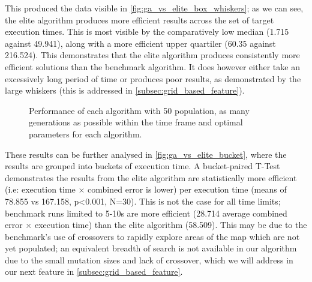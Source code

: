 \documentclass[authoryearcitations]{UoYCSproject}
\begin{document}
This produced the data visible in \autoref{fig:ga_vs_elite_box_whiskers}; as we can see, the elite algorithm produces more efficient results across the set of target execution times. This is most visible by the comparatively low median (1.715 against 49.941), along with a more efficient upper quartiler (60.35 against 216.524). This demonstrates that the elite algorithm produces consistently more efficient solutions than the benchmark algorithm. It does however either take an excessively long period of time or produces poor results, as demonstrated by the large whiskers (this is addressed in \autoref{subsec:grid_based_feature}).


\begin{figure}
	\caption{Performance of each algorithm with 50 population, as many generations as possible within the time frame and optimal parameters for each algorithm.}
	\label{fig:ga_vs_elite_box_whiskers}
\end{figure}

These results can be further analysed in \autoref{fig:ga_vs_elite_bucket}, where the results are grouped into buckets of execution time. A bucket-paired T-Test demonstrates the results from the elite algorithm are statistically more efficient (i.e: execution time $\times$ combined error is lower) per execution time (means of 78.855 vs 167.158, p<0.001, N=30). This is not the case for all time limits; benchmark runs limited to 5-10s are more efficient (28.714 average combined error $\times$ execution time) than the elite algorithm (58.509). This may be due to the benchmark's use of crossovers to rapidly explore areas of the map which are not yet populated; an equivalent breadth of search is not available in our algorithm due to the small mutation sizes and lack of crossover, which we will address in our next feature in \autoref{subsec:grid_based_feature}. 
\end{document}
